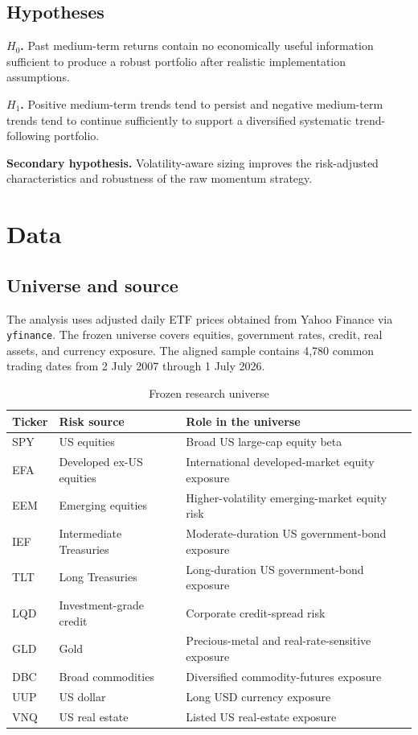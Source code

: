 \documentclass[11pt,a4paper]{article}
\begin{document}
\subsection{Hypotheses}
\textbf{$H_0$.} Past medium-term returns contain no economically useful information sufficient to produce a robust portfolio after realistic implementation assumptions.

\textbf{$H_1$.} Positive medium-term trends tend to persist and negative medium-term trends tend to continue sufficiently to support a diversified systematic trend-following portfolio.

\textbf{Secondary hypothesis.} Volatility-aware sizing improves the risk-adjusted characteristics and robustness of the raw momentum strategy.

\section{Data}
\subsection{Universe and source}
The analysis uses adjusted daily ETF prices obtained from Yahoo Finance via \texttt{yfinance}. The frozen universe covers equities, government rates, credit, real assets, and currency exposure. The aligned sample contains 4,780 common trading dates from 2 July 2007 through 1 July 2026.

\begin{table}[htbp]
\centering
\caption{Frozen research universe}
\label{tab:universe}
\begin{tabularx}{\linewidth}{@{}l l X@{}}
\toprule
\textbf{Ticker} & \textbf{Risk source} & \textbf{Role in the universe} \\
\midrule
SPY & US equities & Broad US large-cap equity beta \\
EFA & Developed ex-US equities & International developed-market equity exposure \\
EEM & Emerging equities & Higher-volatility emerging-market equity risk \\
IEF & Intermediate Treasuries & Moderate-duration US government-bond exposure \\
TLT & Long Treasuries & Long-duration US government-bond exposure \\
LQD & Investment-grade credit & Corporate credit-spread risk \\
GLD & Gold & Precious-metal and real-rate-sensitive exposure \\
DBC & Broad commodities & Diversified commodity-futures exposure \\
UUP & US dollar & Long USD currency exposure \\
VNQ & US real estate & Listed US real-estate exposure \\
\bottomrule
\end{tabularx}
\end{table}
\end{document}
